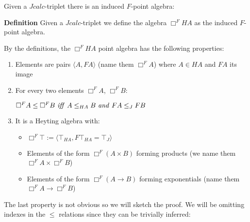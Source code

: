 			Given a $Jcalc$-triplet there is an induced $F$-point algebra:
			\begin{mdframed}
				\textbf{Definition}
				Given a $Jcalc$-triplet we define the algebra  $\Box^{F}HA$ as the induced $F$-point algebra.
			\end{mdframed}
			By the definitions, the $\Box^{F}HA$ point algebra has the following properties:
			\begin{enumerate}
				\item Elements are pairs $\langle A, FA\rangle$ (name them $\Box^{F}A$) where $A\in HA$ and $FA$ its image
				\item For every two elements $\Box^{F}A$, $\Box^{F}B$:

				$\Box^{F}A \le\Box^{F}B \text{ \textit{iff} } A\le_{HA}B 
				\text{ \textit{and} } FA\le_J FB $ 
				
				\item It is a Heyting algebra with:
				\begin{itemize}
					\item $\Box^F\top := \langle \top_{HA}, F\top_{HA}=\top_J \rangle$ 
					\item Elements of the form $\Box^F (A \times B)$ 
					forming products (we name them $\Box^F A\times \Box^F B$)
					\item Elements of the form $\Box^F ( A\rightarrow B)$ 
					forming exponentials (name them $\Box^F{A}\rightarrow \Box^F B$)
				\end{itemize}
			\end{enumerate}
			The last property is not obvious so we will sketch the proof. We will be
			omitting indexes in the $\le$ relations since they can be trivially inferred:
			\begin{theorem}
			\end{theorem}
